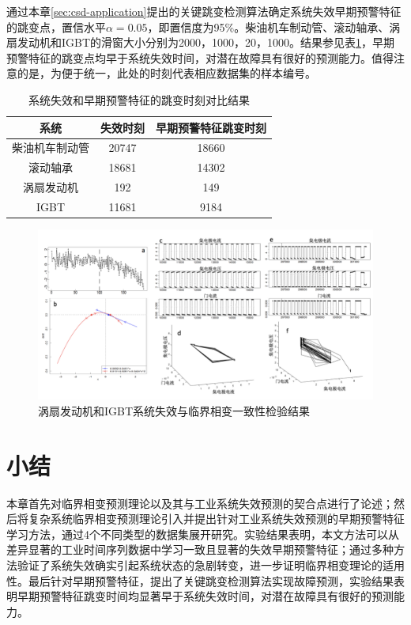 通过本章\ref{sec:csd-application}提出的关键跳变检测算法确定系统失效早期预警特征的跳变点，置信水平$\alpha =0.05$，即置信度为95\%。柴油机车制动管、滚动轴承、涡扇发动机和IGBT的滑窗大小分别为2000，1000，20，1000。结果参见表\ref{tab:csd-alarm-time}，早期预警特征的跳变点均早于系统失效时间，对潜在故障具有很好的预测能力。值得注意的是，为便于统一，此处的时刻代表相应数据集的样本编号。
\begin{table}[htbp]
  \centering
  \caption{系统失效和早期预警特征的跳变时刻对比结果}
  \label{tab:csd-alarm-time}
    \begin{tabular}{ccc}
      \toprule[1.5pt]
      系统 & 失效时刻 &  早期预警特征跳变时刻  \\\midrule[1pt]
      柴油机车制动管 & 20747 & 18660 \\ 
      滚动轴承 & 18681 & 14302 \\
      涡扇发动机 & 192 & 149 \\
      IGBT & 11681 & 9184 \\
      \bottomrule[1.5pt]
    \end{tabular}
\end{table}
\begin{figure}[H]
\centering
\includegraphics[scale=0.6]{figures/csd/csd-proof.png}
\caption{涡扇发动机和IGBT系统失效与临界相变一致性检验结果}
\label{fig:csd-proof}
\end{figure}

\section{小结}

本章首先对临界相变预测理论以及其与工业系统失效预测的契合点进行了论述；然后将复杂系统临界相变预测理论引入并提出针对工业系统失效预测的早期预警特征学习方法，通过4个不同类型的数据集展开研究。实验结果表明，本文方法可以从差异显著的工业时间序列数据中学习一致且显著的失效早期预警特征；通过多种方法验证了系统失效确实引起系统状态的急剧转变，进一步证明临界相变理论的适用性。最后针对早期预警特征，提出了关键跳变检测算法实现故障预测，实验结果表明早期预警特征跳变时间均显著早于系统失效时间，对潜在故障具有很好的预测能力。
